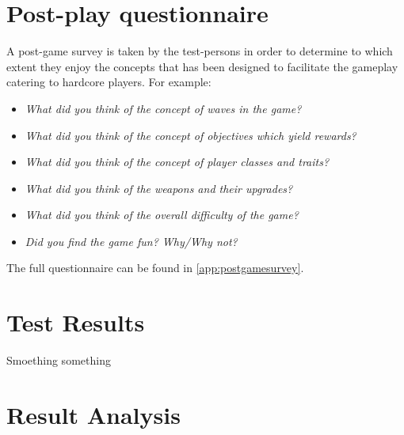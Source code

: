 \section{Post-play questionnaire}
A post-game survey is taken by the test-persons in order to determine to which extent they enjoy the concepts that has been designed to facilitate the gameplay catering to hardcore players.
For example:
\begin{itemize}
\item \emph{What did you think of the concept of waves in the game?}
\item \emph{What did you think of the concept of objectives which yield rewards?}
\item \emph{What did you think of the concept of player classes and traits?}
\item \emph{What did you think of the weapons and their upgrades?}
\item \emph{What did you think of the overall difficulty of the game?}
\item \emph{Did you find the game fun? Why/Why not?}
\end{itemize}
The full questionnaire can be found in \ref{app:postgamesurvey}.

\section{Test Results}
Smoething something

\section{Result Analysis}
